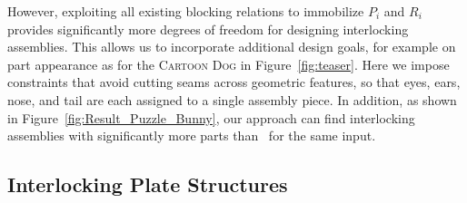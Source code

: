 
However, exploiting all existing blocking relations to immobilize $P_i$ and $R_i$ provides significantly more degrees of freedom for designing interlocking assemblies. This allows us to incorporate additional design goals, for example on part appearance as for the {\textsc{Cartoon Dog}} in Figure~\ref{fig:teaser}. Here we impose constraints that avoid cutting seams across geometric features, so that eyes, ears, nose, and tail are each assigned to a single assembly piece.
In addition, as shown in Figure~\ref{fig:Result_Puzzle_Bunny}, our approach can find interlocking assemblies with significantly more parts than~\cite{Song-2012-InterCubes} for the same input.









\subsection{Interlocking Plate Structures}
\label{subsec:furniture}


